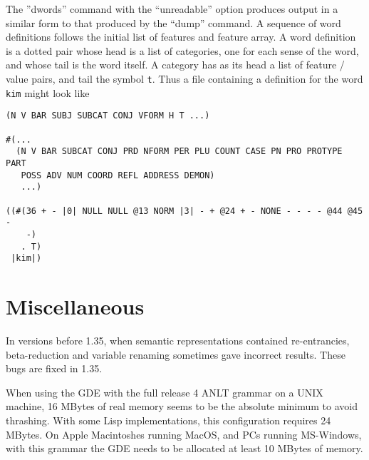 The ''dwords'' command with the ``unreadable'' option produces output in a
similar form to that produced by the ``dump'' command. A sequence of word
definitions follows the initial list of features and feature array.
A word definition is a dotted pair whose head is a
list of categories, one for each sense of the word, and whose tail is
the word itself. A category has as its head a list of feature / value
pairs, and tail the symbol {\tt t}. Thus a file containing a
definition for the word {\tt kim} might look like
{\small
\begin{ex}
\begin{verbatim}
(N V BAR SUBJ SUBCAT CONJ VFORM H T ...)

#(...
  (N V BAR SUBCAT CONJ PRD NFORM PER PLU COUNT CASE PN PRO PROTYPE PART
   POSS ADV NUM COORD REFL ADDRESS DEMON)
   ...)

((#(36 + - |0| NULL NULL @13 NORM |3| - + @24 + - NONE - - - - @44 @45 -
    -)
   . T)
 |kim|)
\end{verbatim}
\end{ex}
}


\section*{Miscellaneous}

In versions before 1.35, when semantic representations contained re-entrancies,
beta-reduction and variable renaming sometimes gave incorrect results. These
bugs are fixed in 1.35.

When using the GDE with the full release 4 ANLT grammar on a UNIX machine,
16 MBytes of real memory seems to be the absolute minimum to avoid thrashing.
With some Lisp implementations, this configuration requires 24 MBytes. On Apple
Macintoshes running MacOS, and PCs running MS-Windows, with this grammar the GDE
needs to be allocated at least 10 MBytes of memory. 


